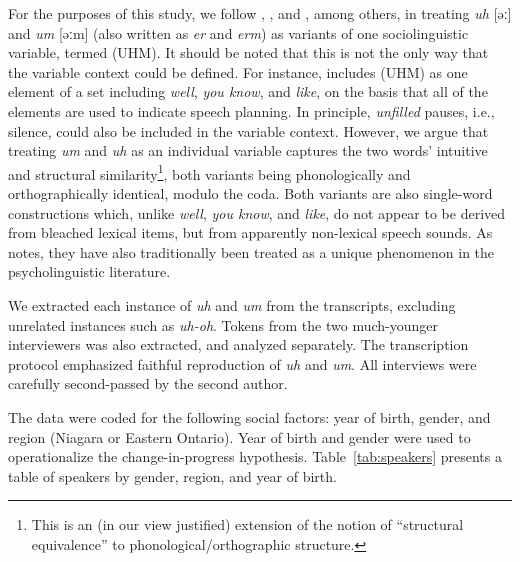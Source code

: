 \documentclass[11pt]{article}
\begin{document}
For the purposes of this study, we follow \textcite{fruehwald2016},
\textcite{wielingetal2016}, and \textcite{tottie2016}, among others, in treating
\emph{uh} [əː] and \emph{um} [əːm] (also written as \emph{er} and \emph{erm}) as
variants of one sociolinguistic variable, termed (UHM).
It should be noted that this is not the only way that the variable context could
be defined.
For instance, \textcite{tottie2018} includes (UHM) as one element of a set
including \emph{well}, \emph{you know}, and \emph{like}, on the basis that all
of the elements are used to indicate speech planning.
In principle, \emph{unfilled} pauses, i.e., silence, could also be included in
the variable context.
However, we argue that treating \emph{um} and \emph{uh} as an individual
variable captures the two words' intuitive and structural similarity\footnote{%
    This is an (in our view justified) extension of the notion of ``structural
    equivalence'' \parencite{pichler2010, tagliamontedenis2010} to
    phonological/orthographic structure.
}, both variants being phonologically and orthographically identical, modulo
the coda.
Both variants are also single-word constructions which, unlike \emph{well},
\emph{you know}, and \emph{like}, do not appear to be derived from bleached
lexical items, but from apparently non-lexical speech sounds.
As \textcite{fruehwald2016} notes, they have also traditionally been treated as
a unique phenomenon in the psycholinguistic literature.


We extracted each instance of \emph{uh} and \emph{um} from the transcripts,
excluding unrelated instances such as \emph{uh-oh}.
Tokens from the two much-younger interviewers was also extracted, and analyzed
separately.
The transcription protocol emphasized faithful reproduction of \emph{uh} and
\emph{um}.
All interviews were carefully second-passed by the second author.

The data were coded for the following social factors:
year of birth, gender, and region (Niagara or Eastern Ontario).
Year of birth and gender were used to operationalize the change-in-progress
hypothesis.
Table~\ref{tab:speakers} presents a table of speakers by gender, region, and
year of birth.
\end{document}
